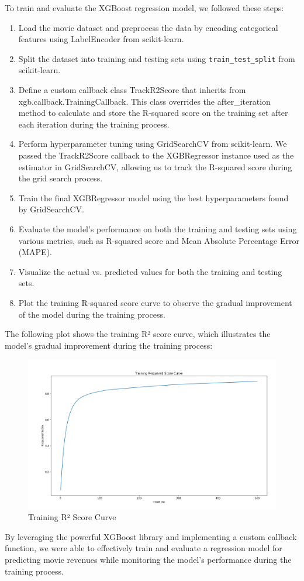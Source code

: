 \documentclass[conference]{IEEEtran}
\begin{document}
        To train and evaluate the XGBoost regression model, we followed these steps:
        \begin{enumerate}
        \item Load the movie dataset and preprocess the data by encoding categorical features using LabelEncoder from scikit-learn.
        \item Split the dataset into training and testing sets using \texttt{train\_test\_split} from scikit-learn.
        \item Define a custom callback class TrackR2Score that inherits from xgb.callback.TrainingCallback. This class overrides the after\_iteration method to calculate and store the R-squared score on the training set after each iteration during the training process.
        \item Perform hyperparameter tuning using GridSearchCV from scikit-learn. We passed the TrackR2Score callback to the XGBRegressor instance used as the estimator in GridSearchCV, allowing us to track the R-squared score during the grid search process.
        \item Train the final XGBRegressor model using the best hyperparameters found by GridSearchCV.
        \item Evaluate the model's performance on both the training and testing sets using various metrics, such as R-squared score and Mean Absolute Percentage Error (MAPE).
        \item Visualize the actual vs. predicted values for both the training and testing sets.
        \item Plot the training R-squared score curve to observe the gradual improvement of the model during the training process.
        \end{enumerate}
    The following plot shows the training R² score curve, which illustrates the model's gradual improvement during the training process:
    \begin{figure}[h]
        \centering
        \includegraphics[width=1\linewidth]{R2 score tracking.png}
        \caption{Training R² Score Curve}
        \label{fig:xg_boost_track}
    \end{figure}
    By leveraging the powerful XGBoost library and implementing a custom callback function, we were able to effectively train and evaluate a regression model for predicting movie revenues while monitoring the model's performance during the training process.
\end{document}
